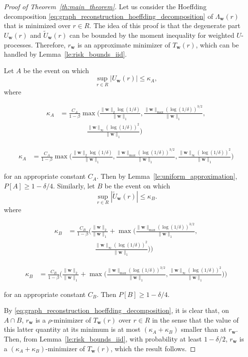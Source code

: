 \documentclass[letterpaper]{article} %
\def\DoubleColumn{}
\def\DoubleColumnEnd{}
\def\SingleColumn{}
\def\SingleColumnEnd{}
\newcommand{\Pro}{P}
\newcommand{\weight}{\mathbf{w}}
\newcommand{\normo}[1]{\|#1\|_1}
\newcommand{\complexbound}{\beta}
\begin{document}
\begin{proof}[Proof of Theorem~\ref{th:main_theorem}]
    Let us consider the Hoeffding decomposition \eqref{eq:graph_reconstruction_hoeffding_decomposition} of $\Lambda_\weight{}(r)$ that is minimized over $r\in R$. The idea of this proof is that the degenerate part $U_\weight{}(r)$ and $\widetilde{U}_\weight{}(r)$ can be bounded by the moment inequality for weighted $U$-processes. Therefore, $r_\weight{}$ is an approximate minimizer of $T_\weight{}(r)$, which can be handled by Lemma~\ref{le:risk_bounds_iid}.

    Let $A$ be the event on which
    \[\sup_{r\in R}|U_\weight{}(r)|\le \kappa_A,\]
    where
    \DoubleColumn
    \begin{align*}
    \kappa_A&=\frac{C_A}{1-\complexbound{}}\max\Big(\frac{\|\weight{}\|_2\log(1/\delta)}{\normo{\weight{}}},\frac{\|\weight{}\|_{\max}(\log(1/\delta))^{3/2}}{\normo{\weight{}}},\\
    &\qquad\qquad \frac{\|\weight{}\|_\infty(\log(1/\delta))^2}{\normo{\weight{}}}\Big)
    \end{align*}
    \DoubleColumnEnd
    \SingleColumn
    \begin{align*}
    \kappa_A&=\frac{C_A}{1-\complexbound{}}\max\Big(\frac{\|\weight{}\|_2\log(1/\delta)}{\normo{\weight{}}},\frac{\|\weight{}\|_{\max}(\log(1/\delta))^{3/2}}{\normo{\weight{}}}, \frac{\|\weight{}\|_\infty(\log(1/\delta))^2}{\normo{\weight{}}}\Big)
    \end{align*}
    \SingleColumnEnd
    for an appropriate constant $C_A$. Then by Lemma~\ref{le:uniform_approximation}, $\Pro[A]\ge 1-\delta/4$. Similarly, let $B$ be the event on which
    \[\sup_{r\in R}|\widetilde{U}_\weight{}(r)|\le \kappa_B.\]
    where
    \DoubleColumn
    \begin{align*}
    \kappa_B&=\frac{C_B}{1-\complexbound{}}\Bigg(\frac{\|\weight{}\|_2}{\normo{\weight{}}}+\max\Big(\frac{\|\weight{}\|_{\max}(\log(1/\delta))^{3/2}}{\normo{\weight{}}},\\
    &\qquad\qquad\frac{\|\weight{}\|_\infty(\log(1/\delta))^2}{\normo{\weight{}}}\Big)\Bigg)
    \end{align*}
    \DoubleColumnEnd
    \SingleColumn
    \begin{align*}
    \kappa_B&=\frac{C_B}{1-\complexbound{}}\Bigg(\frac{\|\weight{}\|_2}{\normo{\weight{}}}+\max\Big(\frac{\|\weight{}\|_{\max}(\log(1/\delta))^{3/2}}{\normo{\weight{}}},\frac{\|\weight{}\|_\infty(\log(1/\delta))^2}{\normo{\weight{}}}\Big)\Bigg)
    \end{align*}
    \SingleColumnEnd
    for an appropriate constant $C_B$.
    Then $\Pro[B]\ge 1-\delta/4$.

    By \eqref{eq:graph_reconstruction_hoeffding_decomposition}, it is clear that, on $A\cap B$, $r_\weight{}$ is a $\rho$-minimizer of $T_\weight{}(r)$ over $r\in R$ in the sense that the value of this latter quantity at its minimum is at most $(\kappa_A+\kappa_B)$ smaller than at $r_\weight{}$. 
    Then, from Lemma~\ref{le:risk_bounds_iid}, with probability at least $1-\delta/2$, $r_\weight{}$ is a $(\kappa_A+\kappa_B)$-minimizer of $T_\weight{}(r)$, which the result follows.
\end{proof}
\end{document}
